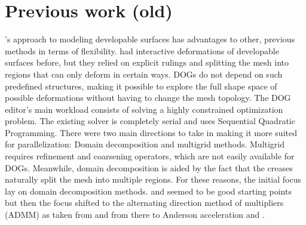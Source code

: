 \documentclass[a4paper,twoside,12pt,nochapterprefix]{scrbook}
\begin{document}
\section{Previous work (old)}\label{sec:prev_work_old}
\cite{Rabinovich:DogNets:2018}'s approach to modeling developable surfaces has advantages to other, previous methods in terms of flexibility.  had interactive deformations of developable surfaces before, but they relied on explicit rulings and splitting the mesh into regions that can only deform in certain ways. DOGs do not depend on such predefined structures, making it possible to explore the full shape space of possible deformations without having to change the mesh topology.\newline %
The DOG editor's main workload consists of solving a highly constrained optimization problem. The existing solver is completely serial and uses Sequential Quadratic Programming. There were two main directions to take in making it more suited for parallelization: Domain decomposition and multigrid methods.\newline
Multigrid requires refinement and coarsening operators, which are not easily available for DOGs. Meanwhile, domain decomposition is aided by the fact that the creases naturally split the mesh into multiple regions. For these reasons, the initial focus lay on domain decomposition methods.\newline
\cite{DDM_book} and \cite{unused_paper} seemed to be good starting points but then the focus shifted to the alternating direction method of multipliers (ADMM) as taken from \cite{Deng2017ParallelMA} and from there to Anderson acceleration \cite{Peng_2018} and \cite{Zhang_2019}.%
\end{document}
